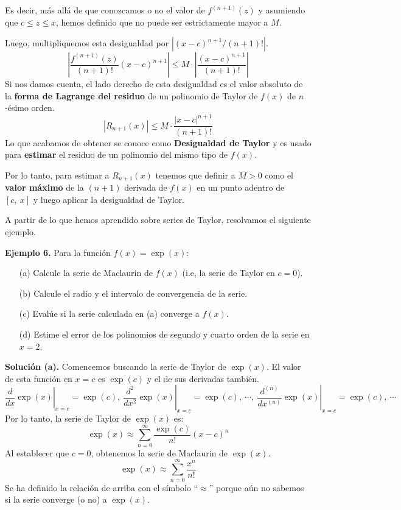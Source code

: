\documentclass[12pt]{article}
\begin{document}
Es decir, más allá de que conozcamos o no el valor de $f^{(n + 1)}(z)$ y asumiendo que $c \leq z \leq x$, hemos definido que no puede ser estrictamente mayor a $M$.

Luego, multipliquemos esta desigualdad por $|(x - c)^{n + 1}/(n + 1)!|$.
\[
  \left|\frac{f^{(n + 1)}(z)}{(n + 1)!}(x - c)^{n + 1}\right| \leq M \cdot \left|\frac{(x - c)^{n + 1}}{(n + 1)!}\right|
\]
Si nos damos cuenta, el lado derecho de esta desigualdad es el valor absoluto de la \textbf{forma de Lagrange del residuo} de un polinomio de Taylor de $f(x)$ de $n$-ésimo orden.
\[
  |R_{n + 1}(x)| \leq M \cdot \frac{|x - c|^{n + 1}}{(n + 1)!}
\]
Lo que acabamos de obtener se conoce como \textbf{Desigualdad de Taylor} y es usado para \textbf{estimar} el residuo de un polinomio del mismo tipo de $f(x)$.

Por lo tanto, para estimar a $R_{n + 1}(x)$ tenemos que definir a $M > 0$ como el \textbf{valor máximo} de la $(n + 1)$ derivada de $f(x)$ en un punto adentro de $[c, \ x]$ y luego aplicar la desigualdad de Taylor.

A partir de lo que hemos aprendido sobre series de Taylor, resolvamos el siguiente ejemplo.

\textbf{Ejemplo 6.} Para la función $f(x) = \exp(x)$:

\begin{itemize}
\item [(a)] Calcule la serie de Maclaurin de $f(x)$ (i.e, la serie de Taylor en $c = 0$).
\item [(b)] Calcule el radio y el intervalo de convergencia de la serie.
\item [(c)] Evalúe si la serie calculada en (a) converge a $f(x)$.
\item [(d)] Estime el error de los polinomios de segundo y cuarto orden de la serie en $x = 2$.
\end{itemize}

\textbf{Solución (a).} Comencemos buscando la serie de Taylor de $\exp(x)$. El valor de esta función en $x = c$ es $\exp(c)$ y el de sus derivadas también.
\[
  \left. \frac{d}{dx} \exp(x)\right|_{x = c} = \exp(c), \
  \left. \frac{d^{2}}{dx^{2}} \exp(x)\right|_{x = c} = \exp(c), \
  \cdots, \
  \left. \frac{d^{(n)}}{dx^{(n)}} \exp(x)\right|_{x = c} = \exp(c), \
  \cdots
\]
Por lo tanto, la serie de Taylor de $\exp(x)$ es:
\[
  \exp(x) \approx \sum_{n = 0}^{\infty} \frac{\exp(c)}{n!}(x - c)^{n}
\]
Al establecer que $c = 0$, obtenemos la serie de Maclaurin de $\exp(x)$.
\[
  \exp(x) \approx \sum_{n = 0}^{\infty} \frac{x^{n}}{n!}
\]
Se ha definido la relación de arriba con el símbolo ``$\approx$'' porque aún no sabemos si la serie converge (o no) a $\exp(x)$.
\end{document}
